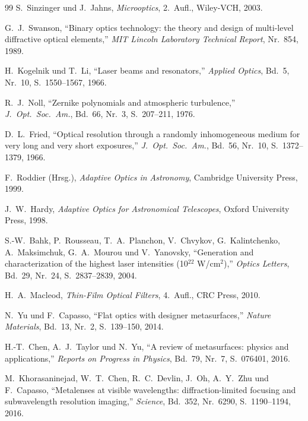 ﻿\documentclass[12pt,a4paper]{article}
\theoremstyle{definition}
\begin{document}
\begin{thebibliography}{99}
		S.~Sinzinger und J.~Jahns,
		\textit{Microoptics}, 2.~Aufl.,
		Wiley-VCH, 2003.

		G.~J.~Swanson,
		``Binary optics technology: the theory and design of multi-level
		diffractive optical elements,''
		\textit{MIT Lincoln Laboratory Technical Report}, Nr.~854, 1989.

		H.~Kogelnik und T.~Li,
		``Laser beams and resonators,''
		\textit{Applied Optics}, Bd.~5, Nr.~10, S.~1550--1567, 1966.

		R.~J.~Noll,
		``Zernike polynomials and atmospheric turbulence,''
		\textit{J.~Opt.~Soc.~Am.}, Bd.~66, Nr.~3, S.~207--211, 1976.

		D.~L.~Fried,
		``Optical resolution through a randomly inhomogeneous medium for very
		long and very short exposures,''
		\textit{J.~Opt.~Soc.~Am.}, Bd.~56, Nr.~10, S.~1372--1379, 1966.

		F.~Roddier (Hrsg.),
		\textit{Adaptive Optics in Astronomy},
		Cambridge University Press, 1999.

		J.~W.~Hardy,
		\textit{Adaptive Optics for Astronomical Telescopes},
		Oxford University Press, 1998.

		S.-W.~Bahk, P.~Rousseau, T.~A.~Planchon, V.~Chvykov, G.~Kalintchenko,
		A.~Maksimchuk, G.~A.~Mourou und V.~Yanovsky,
		``Generation and characterization of the highest laser intensities
		(10$^{22}$ W/cm$^2$),''
		\textit{Optics Letters}, Bd.~29, Nr.~24, S.~2837--2839, 2004.

		H.~A.~Macleod,
		\textit{Thin-Film Optical Filters}, 4.~Aufl.,
		CRC Press, 2010.

		N.~Yu und F.~Capasso,
		``Flat optics with designer metasurfaces,''
		\textit{Nature Materials}, Bd.~13, Nr.~2, S.~139--150, 2014.

		H.-T.~Chen, A.~J.~Taylor und N.~Yu,
		``A review of metasurfaces: physics and applications,''
		\textit{Reports on Progress in Physics}, Bd.~79, Nr.~7, S.~076401, 2016.

		M.~Khorasaninejad, W.~T.~Chen, R.~C.~Devlin, J.~Oh, A.~Y.~Zhu und
		F.~Capasso,
		``Metalenses at visible wavelengths: diffraction-limited focusing and
		subwavelength resolution imaging,''
		\textit{Science}, Bd.~352, Nr.~6290, S.~1190--1194, 2016.


\end{thebibliography}
\end{document}
